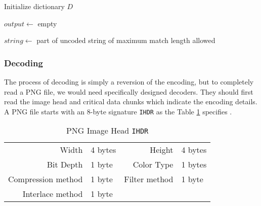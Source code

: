 \documentclass[catalog.tex]{subfiles}
\begin{document}
\begin{Algorithm}
    Initialize dictionary $D$

    $output \gets$ empty

    $string \gets$ part of uncoded string of maximum match length allowed

\end{Algorithm}



\subsubsection*{Decoding}

The process of decoding is simply a reversion of the encoding, but to completely read a PNG file, we would need specifically designed decoders. They should first read the image head and critical data chunks which indicate the encoding details. A PNG file starts with an 8-byte signature \texttt{IHDR} as the Table \ref{tbl:\currfilebase_c} specifies \cite{W3CPNG}.

\begin{table}[!htb]
    \centering
    \begin{tabular}{rlrl}
        \toprule
        Width & 4 bytes & Height & 4 bytes \\
        Bit Depth & 1 byte & Color Type & 1 bytes \\
        Compression method & 1 byte & Filter method & 1 byte \\
        Interlace method & 1 byte & & \\
        \bottomrule
    \end{tabular}
    \caption{PNG Image Head \texttt{IHDR}}
    \label{tbl:\currfilebase_c}
\end{table}
\end{document}
